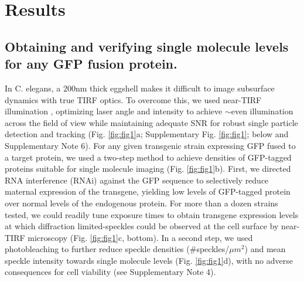  \section{Results}
 
 \subsection{Obtaining and verifying single molecule levels for any GFP fusion protein.}
 
 In C. elegans, a 200nm thick eggshell \cite{nmeth18,nmeth19} makes it difficult to image subsurface dynamics with true TIRF optics. To overcome this, we used near-TIRF illumination \cite{nmeth20}, optimizing laser angle and intensity to achieve $\sim$even illumination across the field of view while maintaining adequate SNR for robust single particle detection and tracking (Fig. \ref{fig:fig1}a; Supplementary Fig. \ref{fig:fig1}; below and Supplementary Note 6). For any given transgenic strain expressing GFP fused to a target protein, we used a two-step method to achieve densities of GFP-tagged proteins suitable for single molecule imaging (Fig. \ref{fig:fig1}b). First, we directed RNA interference (RNAi) against the GFP sequence to selectively reduce maternal expression of the transgene, yielding low levels of GFP-tagged protein over normal levels of the endogenous protein. For more than a dozen strains tested, we could readily tune exposure times to obtain transgene expression levels at which diffraction limited-speckles could be observed at the cell surface by near-TIRF microscopy (Fig. \ref{fig:fig1}c, bottom). In a second step, we used photobleaching to further reduce speckle densities (\#speckles/$\mu$$m^2$) and mean speckle intensity towards single molecule levels (Fig. \ref{fig:fig1}d), with no adverse consequences for cell viability (see Supplementary Note 4).
 
 
 

